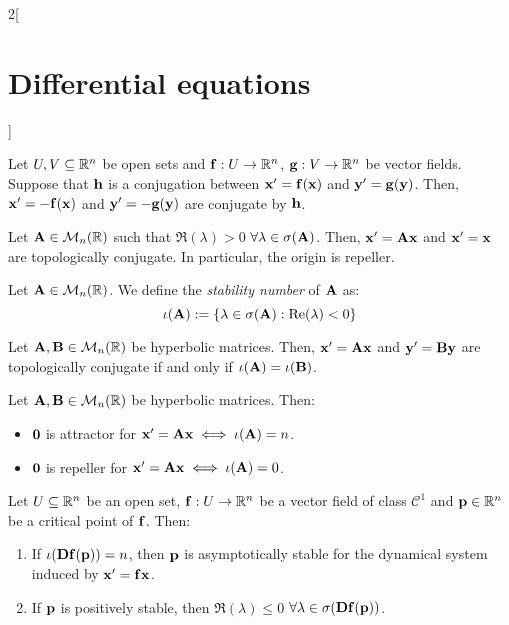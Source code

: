\documentclass[../../../main.tex]{subfiles}
\begin{document}
\begin{multicols}{2}[\section{Differential equations}]
\begin{theorem}
    \end{theorem}
    \begin{prop}
        Let $U,V\subseteq \RR^n$ be open sets and $\vf{f}:U\rightarrow\RR^n$, $\vf{g}:V\rightarrow\RR^n$ be vector fields. Suppose that $\vf{h}$ is a conjugation between $\vf{x}'=\vf{f}(\vf{x})$ and $\vf{y}'=\vf{g}(\vf{y})$. Then, $\vf{x}'=-\vf{f}(\vf{x})$ and $\vf{y}'=-\vf{g}(\vf{y})$ are conjugate by $\vf{h}$.
    \end{prop}
    \begin{corollary}
        Let $\vf{A}\in\mathcal{M}_n(\RR)$ such that $\Re(\lambda)>0$ $\forall\lambda\in\sigma(\vf{A})$. Then, $\vf{x}'=\vf{A}\vf{x}$ and $\vf{x}'=\vf{x}$ are topologically conjugate. In particular, the origin is repeller.
    \end{corollary}
    \begin{definition}
        Let $\vf{A}\in\mathcal{M}_n(\RR)$. We define the \emph{stability number} of $\vf{A}$ as: $$\iota(\vf{A}):=\{\lambda\in\sigma(\vf{A}):\Re(\lambda)<0\}$$
    \end{definition}
    \begin{theorem}
        Let $\vf{A},\vf{B}\in\mathcal{M}_n(\RR)$ be hyperbolic matrices. Then, $\vf{x}'=\vf{A}\vf{x}$ and $\vf{y}'=\vf{B}\vf{y}$ are topologically conjugate if and only if $\iota(\vf{A})=\iota(\vf{B})$.
    \end{theorem}
    \begin{corollary}
        Let $\vf{A},\vf{B}\in\mathcal{M}_n(\RR)$ be hyperbolic matrices. Then:
        \begin{itemize}
            \item $\vf{0}$ is attractor for $\vf{x}'=\vf{A}\vf{x}\iff\iota(\vf{A})=n$.
            \item $\vf{0}$ is repeller for $\vf{x}'=\vf{A}\vf{x}\iff\iota(\vf{A})=0$.
        \end{itemize}
    \end{corollary}
    \begin{theorem}
        Let $U\subseteq \RR^n$ be an open set, $\vf{f}:U\rightarrow\RR^n$ be a vector field of class $\mathcal{C}^1$ and $\vf{p}\in\RR^n$ be a critical point of $\vf{f}$. Then:
        \begin{enumerate}
            \item If $\iota(\vf{Df}(\vf{p}))=n$, then $\vf{p}$ is asymptotically stable for the dynamical system induced by $\vf{x}'=\vf{f}\vf{x}$.
            \item If $\vf{p}$ is positively stable, then $\Re(\lambda)\leq 0$ $\forall\lambda\in\sigma(\vf{Df}(\vf{p}))$.
        \end{enumerate}
    \end{theorem}
\end{multicols}
\end{document}
